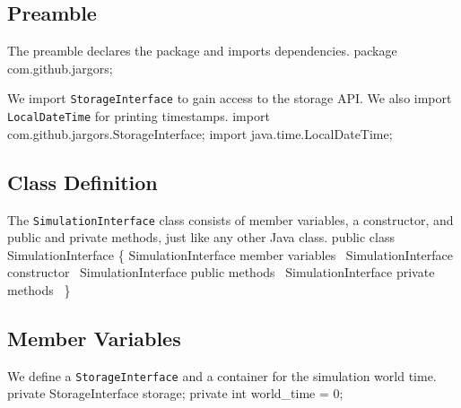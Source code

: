 \documentclass{article}
\def\nwendcode{\endtrivlist \endgroup}
\let\nwdocspar=\par
\begin{document}
\subsection{Preamble}
\label{sec:preamble}
The preamble declares the package and imports dependencies.
\nwenddocs{}\endmoddef{}
package com.github.jargors;
\nwendcode{}\nwdocspar
We import {\tt{}StorageInterface} to gain access to the storage API. We also
import {\tt{}LocalDateTime} for printing timestamps.
\nwenddocs{}\plusendmoddef
import com.github.jargors.StorageInterface;
import java.time.LocalDateTime;
\nwendcode{}\nwdocspar

\subsection{Class Definition}
\label{sec:class-definition}
The {\tt{}SimulationInterface} class consists of member variables, a constructor, and public
and private methods, just like any other Java class.
\nwenddocs{}\endmoddef{}
public class SimulationInterface \{
  \LA{}\code{}SimulationInterface\edoc{} member variables~{\nwtagstyle{}}\RA{}
  \LA{}\code{}SimulationInterface\edoc{} constructor~{\nwtagstyle{}}\RA{}
  \LA{}\code{}SimulationInterface\edoc{} public methods~{\nwtagstyle{}}\RA{}
  \LA{}\code{}SimulationInterface\edoc{} private methods~{\nwtagstyle{}}\RA{}
\}
\nwendcode{}\nwdocspar

\subsection{Member Variables}
\label{sec:member-variables}
We define a {\tt{}StorageInterface} and a container for the simulation world time.
\nwenddocs{}\endmoddef{}
private StorageInterface storage;
private int world_time = 0;
\eatline
{}\nwendcode{}\nwdocspar
\end{document}
